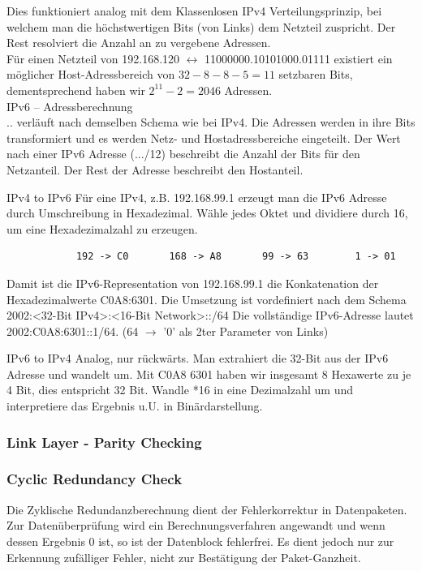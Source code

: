 \documentclass{article}
\begin{document}
        Dies funktioniert analog mit dem Klassenlosen IPv4 Verteilungsprinzip, bei welchem man die höchstwertigen Bits (von Links) dem Netzteil zuspricht. Der Rest resolviert die Anzahl an zu vergebene Adressen.\\
        Für einen Netzteil von 192.168.120 $\leftrightarrow$ 11000000.10101000.01111 existiert ein möglicher Host-Adressbereich von $32-8-8-5 = 11$ setzbaren Bits, dementsprechend haben wir $2^11 - 2 = 2046$  Adressen. \\
        
    IPv6 -- Adressberechnung\\
        .. verläuft nach demselben Schema wie bei IPv4. Die Adressen werden in ihre Bits transformiert und es werden Netz- und Hostadressbereiche eingeteilt.
        Der Wert nach einer IPv6 Adresse (.../12) beschreibt die Anzahl der Bits für den Netzanteil. Der Rest der Adresse beschreibt den Hostanteil. 
        
        IPv4 to IPv6
        Für eine IPv4, z.B. 192.168.99.1 erzeugt man die IPv6 Adresse durch Umschreibung in Hexadezimal.
        Wähle jedes Oktet und dividiere durch 16, um eine Hexadezimalzahl zu erzeugen.
        \begin{verbatim}
            192 -> C0       168 -> A8       99 -> 63        1 -> 01
        \end{verbatim} 
        Damit ist die IPv6-Representation von 192.168.99.1 die Konkatenation der Hexadezimalwerte C0A8:6301.
        Die Umsetzung ist vordefiniert nach dem Schema 2002:<32-Bit IPv4>:<16-Bit Network>::/64
        Die vollständige IPv6-Adresse lautet 2002:C0A8:6301::1/64.  (64 $\rightarrow$ '0' als 2ter Parameter von Links)
        
        IPv6 to IPv4
        Analog, nur rückwärts. Man extrahiert die 32-Bit aus der IPv6 Adresse und wandelt um.
        Mit C0A8 6301 haben wir insgesamt 8 Hexawerte zu je 4 Bit, dies entspricht 32 Bit. Wandle *16 in eine Dezimalzahl um und interpretiere das Ergebnis u.U. in Binärdarstellung.

    \subsubsection{ Link Layer - Parity Checking }
    \subsubsection{ Cyclic Redundancy Check}
    Die Zyklische Redundanzberechnung dient der Fehlerkorrektur in Datenpaketen. Zur Datenüberprüfung wird ein Berechnungsverfahren angewandt und wenn dessen Ergebnis 0 ist, so ist der Datenblock fehlerfrei. Es dient jedoch nur zur Erkennung zufälliger Fehler, nicht zur Bestätigung der Paket-Ganzheit.
    
\end{document}
